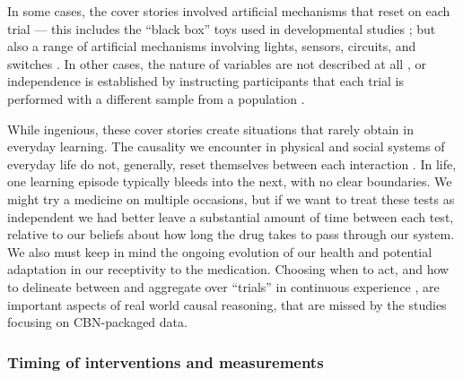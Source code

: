 \documentclass{cambridge7A}%
\begin{document}
In some cases, the cover stories involved artificial mechanisms that reset on each trial --- this includes the ``black box'' toys used in developmental studies \citep{mccormack2016children,gopnik2007causal,coenen2017beliefs}; but also a range of artificial mechanisms involving lights, sensors, circuits, and switches \citep{waldmann2000competition,sobel2006importance,coenen2017beliefs}.  In other cases, the nature of variables are not described at all \citep{bramley2015fcs,bramley2017neurath,rehder2005feature}, or independence is established by instructing participants that each trial is performed with a different sample from a population %
\citep{rehder2003causal, rottman2012causal, rehder2017failures}.

While ingenious, these cover stories create situations that rarely obtain in everyday learning.  The causality we encounter in physical and social systems of everyday life do not, generally, reset themselves between each interaction \citep{greville2007influence,rottman2016searching}.  In life, one learning episode typically bleeds into the next, with no clear boundaries.  We might try a medicine on multiple occasions, but if we want to treat these tests as independent we had better leave a substantial amount of time between each test, relative to our beliefs about how long the drug takes to pass through our system.  We also must keep in mind the ongoing evolution of our health and potential adaptation in our receptivity to the medication. Choosing when to act, and how to delineate between and aggregate over ``trials'' in continuous experience \citep[cf][]{tulving1972episodic}, are important aspects of real world causal reasoning, that are missed by the studies focusing on CBN-packaged data.


\subsubsection{Timing of interventions and measurements}
\end{document}
